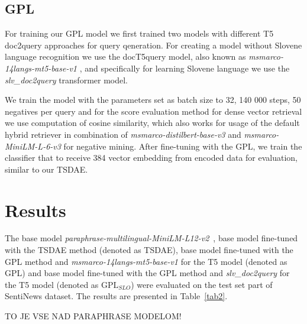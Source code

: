 \documentclass[fleqn,moreauthors,10pt]{ds_report}
\begin{document}
\subsection*{GPL}
For training our GPL model we first trained two models with different T5 doc2query approaches for query qeneration. For creating a model without Slovene language recognition we use the docT5query model, also known as {\it msmarco-14langs-mt5-base-v1} \cite{msmarco14langs}, and specifically for learning Slovene language we use the {\it slv\_doc2query} \cite{boshko} transformer model. 

We train the model with the parameters set as batch size to 32, 140 000 steps, 50 negatives per query and for the score evaluation method for dense vector retrieval we use computation of cosine similarity, which also works for usage of the default hybrid retriever in combination of {\it msmarco-distilbert-base-v3 } \cite{msmarcodistil} and {\it msmarco-MiniLM-L-6-v3} \cite{msmarcominilm} for negative mining. After fine-tuning with the GPL, we train the classifier that to receive 384 vector embedding from encoded data for evaluation, similar to our TSDAE.





\section*{Results}


The base model {\it paraphrase-multilingual-MiniLM-L12-v2}~\cite{reimers-2019-sentence-bert}, base model fine-tuned with the TSDAE method (denoted as TSDAE), base model fine-tuned with the GPL method and {\it msmarco-14langs-mt5-base-v1} \cite{msmarco14langs} for the T5 model (denoted as GPL) and base model fine-tuned with the GPL method and {\it slv\_doc2query} \cite{boshko} for the T5 model (denoted as $\text{GPL}_{SLO}$) were evaluated on the test set part of SentiNews dataset. The results are presented in Table~\ref{tab2}.

TO JE VSE NAD PARAPHRASE MODELOM!
\end{document}
